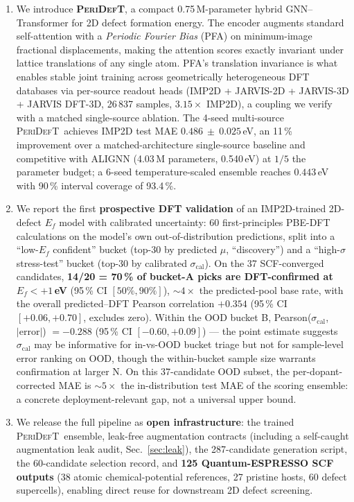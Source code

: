 \documentclass[11pt,a4paper]{article}
\newcommand{\modelname}{\textsc{PeriDefT}}
\begin{document}
\begin{enumerate}[leftmargin=20pt, itemsep=3pt]
\item We introduce \textbf{\modelname}, a compact 0.75\,M-parameter
hybrid GNN--Transformer for 2D defect formation energy. The encoder
augments standard self-attention with a \emph{Periodic Fourier Bias}
(PFA) on minimum-image fractional displacements, making the
attention scores exactly invariant under lattice translations of any
single atom. PFA's translation invariance is what enables stable
joint training across geometrically heterogeneous DFT databases via
per-source readout heads (IMP2D + JARVIS-2D + JARVIS-3D +
JARVIS DFT-3D, 26\,837 samples, $3.15\times$ IMP2D), a coupling we
verify with a matched single-source ablation. The 4-seed
multi-source \modelname\ achieves IMP2D test MAE
$\mathbf{0.486~\pm~0.025}$\,eV, an 11\,\% improvement over a
matched-architecture single-source baseline and competitive with
ALIGNN (4.03\,M parameters, 0.540\,eV) at $1/5$ the parameter
budget; a 6-seed temperature-scaled ensemble reaches
$\mathbf{0.443}$\,eV with 90\,\% interval coverage of 93.4\,\%.

\item We report the first \textbf{prospective DFT validation}
of an IMP2D-trained 2D-defect $E_f$ model with calibrated
uncertainty: 60 first-principles PBE-DFT calculations on the model's
own out-of-distribution predictions, split into a ``low-$E_f$
confident'' bucket (top-30 by predicted $\mu$, ``discovery'') and
a ``high-$\sigma$ stress-test'' bucket (top-30 by calibrated
$\sigma_{\mathrm{cal}}$). On the 37 SCF-converged candidates,
\textbf{14/20 = 70\,\% of bucket-A picks are DFT-confirmed at
$E_f<+1$\,eV} (95\,\% CI $[50\%, 90\%]$), $\sim 4\times$ the
predicted-pool base rate, with the overall predicted--DFT Pearson
correlation $+0.354$ (95\,\% CI $[+0.06, +0.70]$, excludes zero).
Within the OOD bucket B,
Pearson($\sigma_{\mathrm{cal}}$, $|\mathrm{error}|$) $= -0.288$
(95\,\% CI $[-0.60, +0.09]$) --- the point estimate suggests
$\sigma_{\mathrm{cal}}$ may be informative for in-vs-OOD bucket
triage but not for sample-level error ranking on OOD, though the
within-bucket sample size warrants confirmation at larger N.
On this 37-candidate OOD subset, the per-dopant-corrected MAE
is $\sim 5\times$ the in-distribution test MAE of the scoring
ensemble: a concrete deployment-relevant gap, not a universal
upper bound.

\item We release the full pipeline as \textbf{open infrastructure}:
the trained \modelname\ ensemble, leak-free augmentation contracts
(including a self-caught augmentation leak audit, Sec.~\ref{sec:leak}),
the 287-candidate generation script, the 60-candidate selection
record, and \textbf{125 Quantum-ESPRESSO SCF outputs}
(38 atomic chemical-potential references, 27 pristine hosts,
60 defect supercells), enabling direct reuse for downstream 2D
defect screening.
\end{enumerate}
\end{document}
